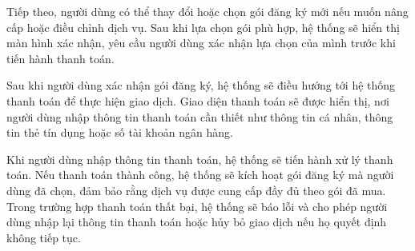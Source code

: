 Tiếp theo, người dùng có thể thay đổi hoặc chọn gói đăng ký mới nếu muốn nâng cấp hoặc điều chỉnh dịch vụ. Sau khi lựa chọn gói phù hợp, hệ thống sẽ hiển thị màn hình xác nhận, yêu cầu người dùng xác nhận lựa chọn của mình trước khi tiến hành thanh toán.

Sau khi người dùng xác nhận gói đăng ký, hệ thống sẽ điều hướng tới hệ thống thanh toán để thực hiện giao dịch. Giao diện thanh toán sẽ được hiển thị, nơi người dùng nhập thông tin thanh toán cần thiết như thông tin cá nhân, thông tin thẻ tín dụng hoặc số tài khoản ngân hàng.

Khi người dùng nhập thông tin thanh toán, hệ thống sẽ tiến hành xử lý thanh toán. Nếu thanh toán thành công, hệ thống sẽ kích hoạt gói đăng ký mà người dùng đã chọn, đảm bảo rằng dịch vụ được cung cấp đầy đủ theo gói đã mua. Trong trường hợp thanh toán thất bại, hệ thống sẽ báo lỗi và cho phép người dùng nhập lại thông tin thanh toán hoặc hủy bỏ giao dịch nếu họ quyết định không tiếp tục.


